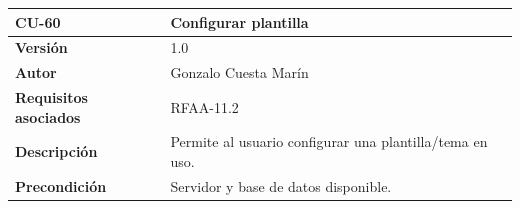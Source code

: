 \documentclass[
]{article}
\begin{document}
\begin{longtable}[]{@{}ll@{}}
\toprule
\begin{minipage}[b]{0.23\columnwidth}\raggedright
\textbf{CU-60}\strut
\end{minipage} & \begin{minipage}[b]{0.71\columnwidth}\raggedright
\textbf{Configurar plantilla}\strut
\end{minipage}\tabularnewline
\midrule
\endhead
\begin{minipage}[t]{0.23\columnwidth}\raggedright
\textbf{Versión}\strut
\end{minipage} & \begin{minipage}[t]{0.71\columnwidth}\raggedright
1.0\strut
\end{minipage}\tabularnewline
\begin{minipage}[t]{0.23\columnwidth}\raggedright
\textbf{Autor}\strut
\end{minipage} & \begin{minipage}[t]{0.71\columnwidth}\raggedright
Gonzalo Cuesta Marín\strut
\end{minipage}\tabularnewline
\begin{minipage}[t]{0.23\columnwidth}\raggedright
\textbf{Requisitos asociados}\strut
\end{minipage} & \begin{minipage}[t]{0.71\columnwidth}\raggedright
RFAA-11.2\strut
\end{minipage}\tabularnewline
\begin{minipage}[t]{0.23\columnwidth}\raggedright
\textbf{Descripción}\strut
\end{minipage} & \begin{minipage}[t]{0.71\columnwidth}\raggedright
Permite al usuario configurar una plantilla/tema en uso.\strut
\end{minipage}\tabularnewline
\begin{minipage}[t]{0.23\columnwidth}\raggedright
\textbf{Precondición}\strut
\end{minipage} & \begin{minipage}[t]{0.71\columnwidth}\raggedright
Servidor y base de datos disponible.


\end{minipage}
\end{longtable}
\end{document}
